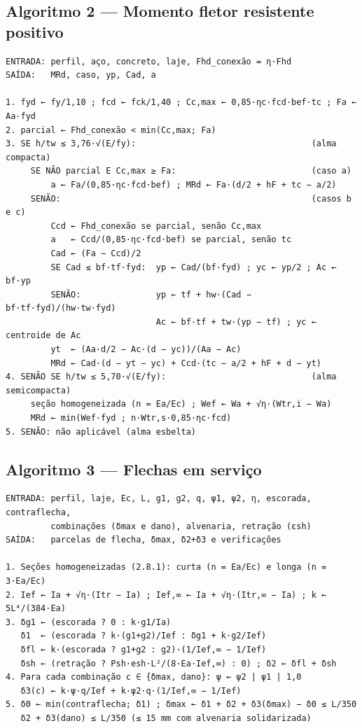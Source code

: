\subsection{Algoritmo 2 --- Momento fletor resistente positivo}
\begin{lstlisting}[caption={Momento fletor resistente positivo},label={lst:alg-momento}]
ENTRADA: perfil, aço, concreto, laje, Fhd_conexão = η·Fhd
SAÍDA:   MRd, caso, yp, Cad, a

1. fyd ← fy/1,10 ; fcd ← fck/1,40 ; Cc,max ← 0,85·ηc·fcd·bef·tc ; Fa ← Aa·fyd
2. parcial ← Fhd_conexão < min(Cc,max; Fa)
3. SE h/tw ≤ 3,76·√(E/fy):                                   (alma compacta)
     SE NÃO parcial E Cc,max ≥ Fa:                           (caso a)
         a ← Fa/(0,85·ηc·fcd·bef) ; MRd ← Fa·(d/2 + hF + tc − a/2)
     SENÃO:                                                  (casos b e c)
         Ccd ← Fhd_conexão se parcial, senão Cc,max
         a   ← Ccd/(0,85·ηc·fcd·bef) se parcial, senão tc
         Cad ← (Fa − Ccd)/2
         SE Cad ≤ bf·tf·fyd:  yp ← Cad/(bf·fyd) ; yc ← yp/2 ; Ac ← bf·yp
         SENÃO:               yp ← tf + hw·(Cad − bf·tf·fyd)/(hw·tw·fyd)
                              Ac ← bf·tf + tw·(yp − tf) ; yc ← centroide de Ac
         yt  ← (Aa·d/2 − Ac·(d − yc))/(Aa − Ac)
         MRd ← Cad·(d − yt − yc) + Ccd·(tc − a/2 + hF + d − yt)
4. SENÃO SE h/tw ≤ 5,70·√(E/fy):                             (alma semicompacta)
     seção homogeneizada (n = Ea/Ec) ; Wef ← Wa + √η·(Wtr,i − Wa)
     MRd ← min(Wef·fyd ; n·Wtr,s·0,85·ηc·fcd)
5. SENÃO: não aplicável (alma esbelta)
\end{lstlisting}

\subsection{Algoritmo 3 --- Flechas em serviço}
\begin{lstlisting}[caption={Flechas em serviço},label={lst:alg-flechas}]
ENTRADA: perfil, laje, Ec, L, g1, g2, q, ψ1, ψ2, η, escorada, contraflecha,
         combinações (δmax e dano), alvenaria, retração (εsh)
SAÍDA:   parcelas de flecha, δmax, δ2+δ3 e verificações

1. Seções homogeneizadas (2.8.1): curta (n = Ea/Ec) e longa (n = 3·Ea/Ec)
2. Ief ← Ia + √η·(Itr − Ia) ; Ief,∞ ← Ia + √η·(Itr,∞ − Ia) ; k ← 5L⁴/(384·Ea)
3. δg1 ← (escorada ? 0 : k·g1/Ia)
   δ1  ← (escorada ? k·(g1+g2)/Ief : δg1 + k·g2/Ief)
   δfl ← k·(escorada ? g1+g2 : g2)·(1/Ief,∞ − 1/Ief)
   δsh ← (retração ? Psh·esh·L²/(8·Ea·Ief,∞) : 0) ; δ2 ← δfl + δsh
4. Para cada combinação c ∈ {δmax, dano}: ψ ← ψ2 | ψ1 | 1,0
   δ3(c) ← k·ψ·q/Ief + k·ψ2·q·(1/Ief,∞ − 1/Ief)
5. δ0 ← min(contraflecha; δ1) ; δmax ← δ1 + δ2 + δ3(δmax) − δ0 ≤ L/350
   δ2 + δ3(dano) ≤ L/350 (≤ 15 mm com alvenaria solidarizada)
\end{lstlisting}

